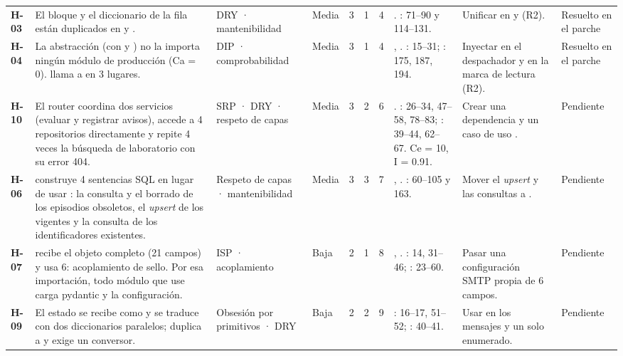 \documentclass[11pt]{article}
\begin{document}
\begin{longtable}{C{0.95cm}L{6.75cm}L{2.2cm}C{1.0cm}C{0.65cm}C{0.65cm}C{0.8cm}L{4.6cm}L{4.4cm}L{1.75cm}}
\textsf{\textbf{H-03}} & El bloque  y el diccionario de la fila están duplicados en  y . & DRY · mantenibilidad & Media & 3 & 1 & 4 & . : 71--90 y 114--131. & Unificar en \allowbreak{} y  (R2). & Resuelto en el parche\\
\textsf{\textbf{H-04}} & La abstracción  (con  y ) no la importa ningún módulo de producción (Ca = 0).  llama a  en 3 lugares. & DIP · comprobabilidad & Media & 3 & 1 & 4 & , . : 15--31; : 175, 187, 194. & Inyectar  en el despachador y en la marca de lectura (R2). & Resuelto en el parche\\
\textsf{\textbf{H-10}} & El router coordina dos servicios (evaluar y registrar avisos), accede a 4 repositorios directamente y repite 4 veces la búsqueda de laboratorio con su error 404. & SRP · DRY · respeto de capas & Media & 3 & 2 & 6 & . : 26--34, 47--58, 78--83; : 39--44, 62--67. Ce = 10, I = 0.91. & Crear una dependencia  y un caso de uso . & Pendiente\\
\textsf{\textbf{H-06}} &  construye 4 sentencias SQL en lugar de usar : la consulta y el borrado de los episodios obsoletos, el \emph{upsert} de los vigentes y la consulta de los identificadores existentes. & Respeto de capas · mantenibilidad & Media & 3 & 3 & 7 & , . : 60--105 y 163. & Mover el \emph{upsert} y las consultas a . & Pendiente\\
\textsf{\textbf{H-07}} &  recibe el objeto  completo (21 campos) y usa 6: acoplamiento de sello. Por esa importación, todo módulo que use  carga pydantic y la configuración. & ISP · acoplamiento & Baja & 2 & 1 & 8 & , . : 14, 31--46; : 23--60. & Pasar una configuración SMTP propia de 6 campos. & Pendiente\\
\textsf{\textbf{H-09}} & El estado se recibe como  y se traduce con dos diccionarios paralelos;  duplica a  y exige un conversor. & Obsesión por primitivos · DRY & Baja & 2 & 2 & 9 & : 16--17, 51--52; : 40--41. & Usar  en los mensajes y un solo enumerado. & Pendiente\\

\end{longtable}
\end{document}
